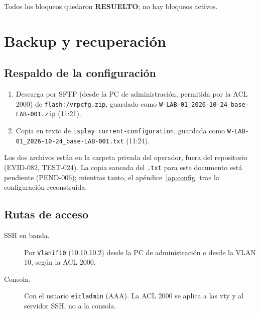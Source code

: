 \documentclass[11pt,a4paper]{article}
\newcommand{\estado}[1]{%
  \ifstrequal{#1}{COMPLETADA}{\textcolor{okgreen}{\textbf{\footnotesize #1}}}{%
  \ifstrequal{#1}{OPERATIVO VALIDADO}{\textcolor{okgreen}{\textbf{\footnotesize #1}}}{%
  \ifstrequal{#1}{OK}{\textcolor{okgreen}{\textbf{\footnotesize #1}}}{%
  \ifstrequal{#1}{RESUELTO}{\textcolor{okgreen}{\textbf{\footnotesize #1}}}{%
  \ifstrequal{#1}{EN CURSO}{\textcolor{amber}{\textbf{\footnotesize #1}}}{%
  \ifstrequal{#1}{REPORTADO}{\textcolor{amber}{\textbf{\footnotesize #1}}}{%
  \ifstrequal{#1}{NO EJECUTADA}{\textcolor{muted}{\textbf{\footnotesize #1}}}{%
  \ifstrequal{#1}{PROPUESTO}{\textcolor{violet}{\textbf{\footnotesize #1}}}{%
  \ifstrequal{#1}{PENDIENTE}{\textcolor{alertred}{\textbf{\footnotesize #1}}}{%
  \textbf{\footnotesize #1}}}}}}}}}}}
\newcommand{\fn}[1]{\texttt{\fnbreaks#1\fnend}}
\def\fnbreaks#1\fnend{\begingroup\fnactive\scantokens{#1\noexpand}\endgroup}
\gdef\fnactive{\catcode`\-=\active\catcode`\/=\active
  \def-{\char`\-\allowbreak}\def/{\char`\/\allowbreak}\let\_\fnus}
\newcommand{\fnus}{\textunderscore\allowbreak}
\begin{document}
Todos los bloqueos quedaron \estado{RESUELTO}; no hay bloqueos activos.

\newpage
\section{Backup y recuperación}\label{sec:backup}
\subsection{Respaldo de la configuración}
\begin{enumerate}
  \item Descarga por SFTP (desde la PC de administración, permitida por la ACL 2000) de \texttt{flash:/vrpcfg.zip}, guardado como \fn{SW-LAB-01\_2026-10-24\_base-LAB-001.zip} (11:21).
  \item Copia en texto de \fn{display current-configuration}, guardada como \fn{SW-LAB-01\_2026-10-24\_base-LAB-001.txt} (11:24).
\end{enumerate}
Los dos archivos están en la carpeta privada del operador, fuera del repositorio (EVID-082, TEST-024). La copia saneada del \texttt{.txt} para este documento está pendiente (PEND-006); mientras tanto, el apéndice~\ref{ap:config} trae la configuración reconstruida.


\subsection{Rutas de acceso}
\begin{description}
  \item[SSH en banda.] Por \texttt{Vlanif10} (10.10.10.2) desde la PC de administración o desde la VLAN 10, según la ACL 2000.
  \item[Consola.] Con el usuario \texttt{eicladmin} (AAA). La ACL 2000 se aplica a las vty y al servidor SSH, no a la consola.
\end{description}

\end{document}
